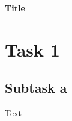 \documentclass[a4paper,12pt]{article}
\begin{document}
\begin{center}
    \Large
    \bfseries
    Title
\end{center}

\raggedright

\section{Task 1}

\subsection{Subtask a}

Text
\end{document}
